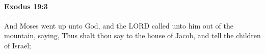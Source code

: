 
		\paragraph{Exodus 19:3} %
			\label{EXODUS-19-3}

			And Moses went up unto God, and the LORD called unto him out of the mountain, saying, Thus shalt thou say to the house of Jacob, and tell the children of Israel;


